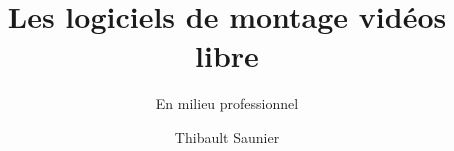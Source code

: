 \documentclass[a4paper,11pt]{article}
\begin{document}
\title{Les logiciels de montage vidéos libre}
\subtitle{En milieu professionnel}
\author{Thibault Saunier}
\withdate
\subject{Les logiciels de montage vidéos libre en milieu professionnel}
\maketitle



\tableofcontents






%





\end{document}
